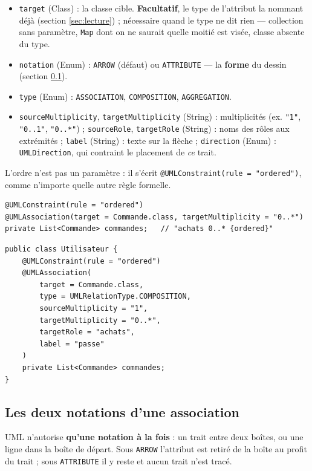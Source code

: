 \documentclass[12pt, a4paper]{article}
\begin{document}
\begin{itemize}
    \item \texttt{target} (Class) : la classe cible. \textbf{Facultatif}, le type de l'attribut la nommant déjà (section \ref{sec:lecture}) ; nécessaire quand le type ne dit rien --- collection sans paramètre, \texttt{Map} dont on ne saurait quelle moitié est visée, classe absente du type.
    \item \texttt{notation} (Enum) : \texttt{ARROW} (défaut) ou \texttt{ATTRIBUTE} --- la \textbf{forme} du dessin (section \ref{sec:notation}).
    \item \texttt{type} (Enum) : \texttt{ASSOCIATION}, \texttt{COMPOSITION}, \texttt{AGGREGATION}.
    \item \texttt{sourceMultiplicity}, \texttt{targetMultiplicity} (String) : multiplicités (ex. \texttt{"1"}, \texttt{"0..1"}, \texttt{"0..*"}) ; \texttt{sourceRole}, \texttt{targetRole} (String) : noms des rôles aux extrémités ; \texttt{label} (String) : texte sur la flèche ; \texttt{direction} (Enum) : \texttt{UMLDirection}, qui contraint le placement de \textit{ce} trait.
\end{itemize}

\noindent L'ordre n'est pas un paramètre : il s'écrit \texttt{@UMLConstraint(rule = "ordered")}, comme n'importe quelle autre règle formelle.

\begin{lstlisting}
@UMLConstraint(rule = "ordered")
@UMLAssociation(target = Commande.class, targetMultiplicity = "0..*")
private List<Commande> commandes;   // "achats 0..* {ordered}"
\end{lstlisting}

\begin{lstlisting}
public class Utilisateur {
    @UMLConstraint(rule = "ordered")
    @UMLAssociation(
        target = Commande.class,
        type = UMLRelationType.COMPOSITION,
        sourceMultiplicity = "1",
        targetMultiplicity = "0..*",
        targetRole = "achats",
        label = "passe"
    )
    private List<Commande> commandes;
}
\end{lstlisting}

\subsection{Les deux notations d'une association}
\label{sec:notation}

UML n'autorise \textbf{qu'une notation à la fois} : un trait entre deux boîtes, ou une ligne dans la boîte de départ. Sous \texttt{ARROW} l'attribut est retiré de la boîte au profit du trait ; sous \texttt{ATTRIBUTE} il y reste et aucun trait n'est tracé.
\end{document}
